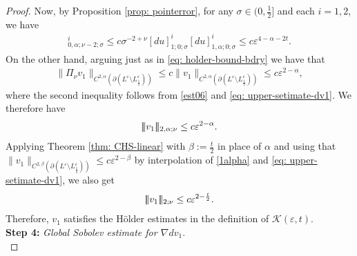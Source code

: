 \documentclass[11pt]{amsart}
\DeclarePairedDelimiter{\tnorm}{\vert\!\vert\!\vert}{\vert\!\vert\!\vert}
\theoremstyle{definition}
\theoremstyle{remark}
\begin{document}
\begin{proof}
    
    Now, by Proposition \ref{prop: pointerror}, for any $\sigma\in (0,\frac{1}{2}]$ and each $i=1,2$, we have
    \begin{align*}
        [R(u)]^i_{0,\alpha;\nu-2;\sigma}\leq c \sigma^{-2+\nu}[du]^i_{1;0;\sigma}[du]^i_{1,\alpha;0;\sigma}\leq c\varepsilon^{4-\alpha-2t}.
    \end{align*}
    On the other hand, arguing just as in \eqref{eq: holder-bound-bdry} we have that
    \begin{align*}
        \lVert \Pi_\nu v_1\rVert_{C^{2,\alpha}(\partial(L^\varepsilon \setminus  L^\varepsilon_\frac{1}{2}))}\leq c\lVert v_1\rVert_{C^{2,\alpha}(\partial(L^\varepsilon \setminus  L^\varepsilon_\frac{1}{2}))}\leq c\varepsilon^{2-\alpha},
    \end{align*}
    where the second inequality follows from \eqref{est06} and \eqref{eq: upper-setimate-dv1}. We therefore have 
    \begin{align*}
        \tnorm{v_1}_{2,\alpha;\nu}\leq c \varepsilon^{2-\alpha}.
    \end{align*}
    Applying Theorem \ref{thm: CHS-linear} with $\beta:=\frac{t}{2}$ in place of $\alpha$ and using that $\lVert v_1\rVert_{C^{2,\beta}(\partial(L^\varepsilon \setminus L^\varepsilon_\frac{1}{2}))}\leq c\varepsilon^{2-\beta}$ by interpolation of \eqref{1alpha} and \eqref{eq: upper-setimate-dv1}, we also get
    \begin{align*}
        \tnorm{v_1}_{2;\nu}\leq c \varepsilon^{2-\frac{t}{2}}.
    \end{align*}
    Therefore, $v_1$ satisfies the H\"older estimates in the definition of $\mathscr{K}(\varepsilon,t)$.\\

    \noindent
    \textbf{Step 4:} \emph{Global Sobolev estimate for $\nabla d v_1$}.\\


\end{proof}
\end{document}
